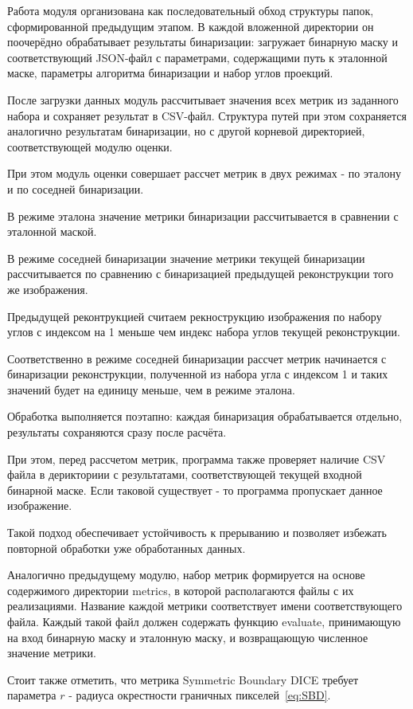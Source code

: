 Работа модуля организована как последовательный обход структуры папок, сформированной предыдущим этапом. В каждой вложенной директории он поочерёдно обрабатывает результаты бинаризации: загружает бинарную маску и соответствующий JSON-файл с параметрами, содержащими путь к эталонной маске, параметры алгоритма бинаризации и набор углов проекций.

После загрузки данных модуль рассчитывает значения всех метрик из заданного набора и сохраняет результат в CSV-файл. Структура путей при этом сохраняется аналогично результатам бинаризации, но с другой корневой директорией, соответствующей модулю оценки.

При этом модуль оценки совершает рассчет метрик в двух режимах - по эталону и по соседней бинаризации.

В режиме эталона значение метрики бинаризации рассчитывается в сравнении с эталонной маской. 

В режиме соседней бинаризации значение метрики текущей бинаризации рассчитывается по сравнению с бинаризацией предыдущей реконструкции того же изображения.

Предыдущей реконтрукцией считаем рекнострукцию изображения по набору углов с индексом на 1 меньше чем индекс набора углов текущей реконструкции. 

Соответственно в режиме соседней бинаризации рассчет метрик начинается с бинаризации реконструкции, полученной из набора угла с индексом 1 и таких значений будет на единицу меньше, чем в режиме эталона.

Обработка выполняется поэтапно: каждая бинаризация обрабатывается отдельно, результаты сохраняются сразу после расчёта. 

При этом, перед рассчетом метрик, программа также проверяет наличие CSV файла в дерикториии с результатами, соответствующей текущей входной бинарной маске. Если таковой существует - то программа пропускает данное изображение.

Такой подход обеспечивает устойчивость к прерыванию и позволяет избежать повторной обработки уже обработанных данных.

Аналогично предыдущему модулю, набор метрик формируется на основе содержимого директории metrics, в которой располагаются файлы с их реализациями. Название каждой метрики соответствует имени соответствующего файла. Каждый такой файл должен содержать функцию evaluate, принимающую на вход бинарную маску и эталонную маску, и возвращающую численное значение метрики.

Стоит также отметить, что метрика Symmetric Boundary DICE требует параметра \(r\) - радиуса окрестности граничных пикселей~\eqref{eq:SBD}.

